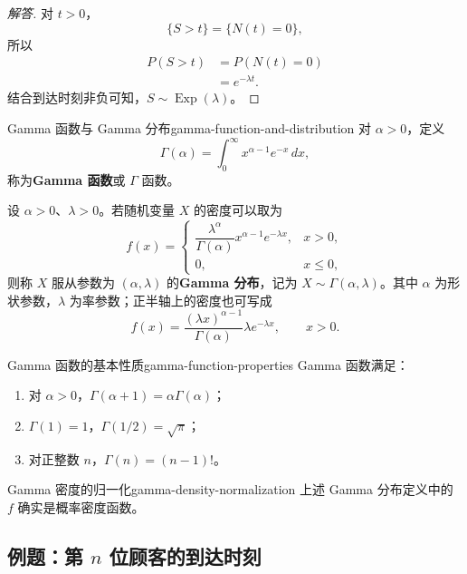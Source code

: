\begin{proof}[解答]
对 $t>0$，
\[
\{S>t\}=\{N(t)=0\},
\]
所以
\[
\begin{aligned}
P(S>t)
&=P(N(t)=0)\\
&=e^{-\lambda t}.
\end{aligned}
\]
结合到达时刻非负可知，$S\sim\operatorname{Exp}(\lambda)$。
\end{proof}

\begin{mydefinition}{Gamma 函数与 Gamma 分布}{gamma-function-and-distribution}
对 $\alpha>0$，定义
\[
\Gamma(\alpha)=\int_0^\infty x^{\alpha-1}e^{-x}\,dx,
\]
称为\textbf{Gamma 函数}或 $\Gamma$ 函数。

设 $\alpha>0$、$\lambda>0$。若随机变量 $X$ 的密度可以取为
\[
f(x)=
\begin{cases}
\dfrac{\lambda^\alpha}{\Gamma(\alpha)}x^{\alpha-1}e^{-\lambda x},
&x>0,\\[0.5em]
0,&x\leq0,
\end{cases}
\]
则称 $X$ 服从参数为 $(\alpha,\lambda)$ 的\textbf{Gamma 分布}，记为 $X\sim\Gamma(\alpha,\lambda)$。其中 $\alpha$ 为形状参数，$\lambda$ 为率参数；正半轴上的密度也可写成
\[
f(x)=\frac{(\lambda x)^{\alpha-1}}{\Gamma(\alpha)}
\lambda e^{-\lambda x},\qquad x>0.
\]
\end{mydefinition}

\begin{proposition}{Gamma 函数的基本性质}{gamma-function-properties}
Gamma 函数满足：
\begin{enumerate}
    \item 对 $\alpha>0$，$\Gamma(\alpha+1)=\alpha\Gamma(\alpha)$；
    \item $\Gamma(1)=1$，$\Gamma(1/2)=\sqrt\pi$；
    \item 对正整数 $n$，$\Gamma(n)=(n-1)!$。
\end{enumerate}
\end{proposition}

\begin{proposition}{Gamma 密度的归一化}{gamma-density-normalization}
上述 Gamma 分布定义中的 $f$ 确实是概率密度函数。
\end{proposition}

\subsection{例题：\texorpdfstring{第 $n$ 位顾客的到达时刻}{第 n 位顾客的到达时刻}}\label{note:c2:e16}
